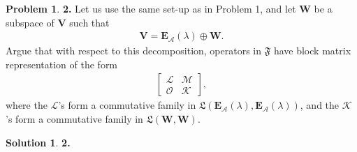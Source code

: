 \documentclass{book}
\theoremstyle{definition}
\newtheorem*{prob*}{Problem}
\newtheorem*{sln*}{Solution}
\newcommand{\V}{\mathbf{V}}
\newcommand{\W}{\mathbf{W}}
\newcommand{\A}{\mathcal{A}}
\newcommand{\lag}{\mathcal{L}}
\newcommand{\M}{\mathcal{M}}
\begin{document}
\begin{prob*}\textbf{2.} Let us use the same set-up as in Problem 1, and let $\W$ be a subspace of $\V$ such that 
	\begin{align*}
	\V = \textbf{E}_\A(\lambda) \oplus\W.
	\end{align*}
	Argue that with respect to this decomposition, operators in $\mathfrak{F}$ have block matrix representation of the form
	\begin{align*}
	\begin{bmatrix}
	\lag & \M \\
	\mathcal{O} & \mathcal{K}
	\end{bmatrix},
	\end{align*}
	where the $\lag$'s form a commutative family in $\mathfrak{L}(\textbf{E}_\A(\lambda), \textbf{E}_\A(\lambda))$, and the $\mathcal{K}$'s form a commutative family in $\mathfrak{L}(\W,\W)$. 
	
	\begin{sln*}\textbf{2.}\\
		

\end{sln*}
\end{prob*}
\end{document}
